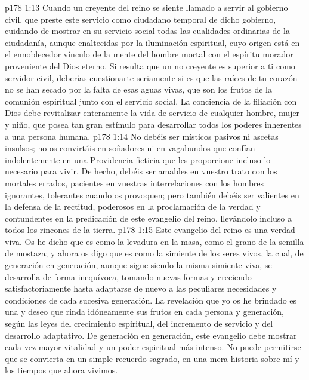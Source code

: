 \vs p178 1:13 Cuando un creyente del reino se siente llamado a servir al gobierno civil, que preste este servicio como ciudadano temporal de dicho gobierno, cuidando de mostrar en su servicio social todas las cualidades ordinarias de la ciudadanía, aunque enaltecidas por la iluminación espiritual, cuyo origen está en el ennoblecedor vínculo de la mente del hombre mortal con el espíritu morador proveniente del Dios eterno. Si resulta que un no creyente es superior a ti como servidor civil, deberías cuestionarte seriamente si es que las raíces de tu corazón no se han secado por la falta de esas aguas vivas, que son los frutos de la comunión espiritual junto con el servicio social. La conciencia de la filiación con Dios debe revitalizar enteramente la vida de servicio de cualquier hombre, mujer y niño, que posea tan gran estímulo para desarrollar todos los poderes inherentes a una persona humana.
\vs p178 1:14 No debéis ser místicos pasivos ni ascetas insulsos; no os convirtáis en soñadores ni en vagabundos que confían indolentemente en una Providencia ficticia que les proporcione incluso lo necesario para vivir. De hecho, debéis ser amables en vuestro trato con los mortales errados, pacientes en vuestras interrelaciones con los hombres ignorantes, tolerantes cuando os provoquen; pero también debéis ser valientes en la defensa de la rectitud, poderosos en la proclamación de la verdad y contundentes en la predicación de este evangelio del reino, llevándolo incluso a todos los rincones de la tierra.
\vs p178 1:15 Este evangelio del reino es una verdad viva. Os he dicho que es como la levadura en la masa, como el grano de la semilla de mostaza; y ahora os digo que es como la simiente de los seres vivos, la cual, de generación en generación, aunque sigue siendo la misma simiente viva, se desarrolla de forma inequívoca, tomando nuevas formas y creciendo satisfactoriamente hasta adaptarse de nuevo a las peculiares necesidades y condiciones de cada sucesiva generación. La revelación que yo os he brindado es una  y deseo que rinda idóneamente sus frutos en cada persona y generación, según las leyes del crecimiento espiritual, del incremento de servicio y del desarrollo adaptativo. De generación en generación, este evangelio debe mostrar cada vez mayor vitalidad y un poder espiritual más intenso. No puede permitirse que se convierta en un simple recuerdo sagrado, en una mera historia sobre mí y los tiempos que ahora vivimos.
